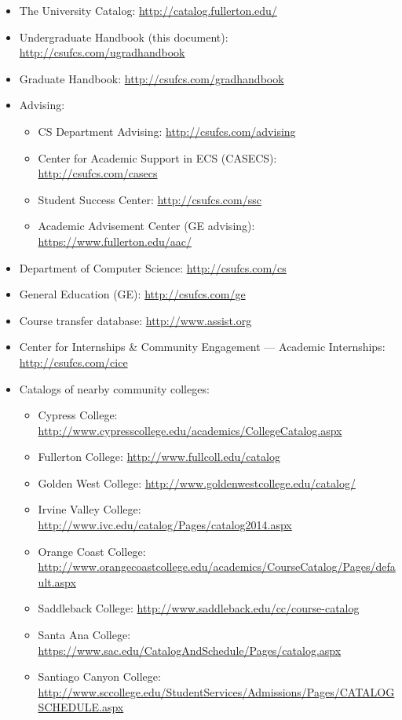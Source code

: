 \documentclass{book}
\newcommand{\shrunkurl}[1]{\url{http://csufcs.com/#1}}
\begin{document}
\begin{itemize}
\item The University Catalog: \url{http://catalog.fullerton.edu/}
\item Undergraduate Handbook (this document): \shrunkurl{ugradhandbook}
\item Graduate Handbook: \shrunkurl{gradhandbook}
\item Advising:
  \begin{itemize}
    \item CS Department Advising: \shrunkurl{advising}
    \item Center for Academic Support in ECS (CASECS): \shrunkurl{casecs}
    \item Student Success Center: \shrunkurl{ssc}
    \item Academic Advisement Center (GE advising): \url{https://www.fullerton.edu/aac/}
    \end{itemize}
\item Department of Computer Science: \shrunkurl{cs}
\item General Education (GE): \shrunkurl{ge}
\item Course transfer database: \url{http://www.assist.org}
\item Center for Internships \& Community Engagement --- Academic Internships: \shrunkurl{cice}
\item Catalogs of nearby community colleges:
  \begin{itemize}
    \item Cypress College: \url{http://www.cypresscollege.edu/academics/CollegeCatalog.aspx}
    \item Fullerton College: \url{http://www.fullcoll.edu/catalog}
    \item Golden West College: \url{http://www.goldenwestcollege.edu/catalog/}
    \item Irvine Valley College: \url{http://www.ivc.edu/catalog/Pages/catalog2014.aspx}
    \item Orange Coast College: \url{http://www.orangecoastcollege.edu/academics/CourseCatalog/Pages/default.aspx}
    \item Saddleback College: \url{http://www.saddleback.edu/cc/course-catalog}
    \item Santa Ana College: \url{https://www.sac.edu/CatalogAndSchedule/Pages/catalog.aspx}
    \item Santiago Canyon College: \url{http://www.sccollege.edu/StudentServices/Admissions/Pages/CATALOGSCHEDULE.aspx}
  \end{itemize}
\end{itemize}
\end{document}
